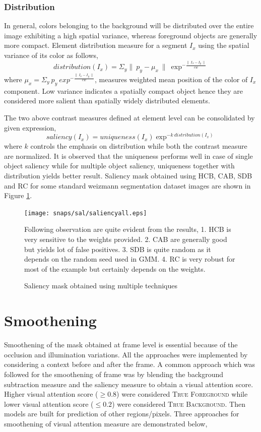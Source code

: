 \subsubsection{Distribution}
In general, colors belonging to the background will be distributed over the entire image exhibiting a high spatial variance, whereas foreground objects are generally more compact. Element distribution measure for a segment $I_{x}$ using the spatial variance of its color as follows,
$$distribution(I_{x}) = \Sigma_{y} \parallel~p_{y} -\mu_{x}~\parallel~\exp^{-\frac{\parallel~I_{x} - I_{y}~\parallel}{cw}}$$ 
where $\mu_{x} = \Sigma_{y}~p_{y}~exp^{-\frac{\parallel~I_{x} - I_{y}~\parallel}{cw}}$, measures weighted mean position of the color of $I_{x}$ component. Low variance indicates a spatially compact object hence they are considered more salient than spatially widely distributed elements.

\par The two above contrast measures defined at element level can be consolidated by given expression,
$$saliency(I_{x}) = uniqueness(I_{x}) \exp^{-k~distribution(I_{x})}$$
where $k$ controls the emphasis on distribution while both the contrast measure are normalized. It is observed that the uniqueness performs well in case of single object saliency while for multiple object saliency, uniqueness together with distribution yields better result. Saliency mask obtained using HCB, CAB, SDB and RC for some standard weizmann segmentation dataset images are shown in Figure \ref{fig:sal}. 

\begin{figure}[htpb]
   \begin{center}
	    \texttt{[image: snaps/sal/saliencyall.eps]}     
     \caption {Saliency mask obtained using multiple techniques}
     \medskip \small 
     Following observation are quite evident from the results, 1. HCB is very sensitive to the weights provided. 2. CAB are generally good but yields lot of false positives. 3. SDB is quite random as it depends on the random seed used in GMM. 4. RC is very robust for most of the example but certainly depends on the weights.
   \label{fig:sal}
   \end{center}
 \end{figure}

 \section{Smoothening}
  \label{sec:ts}
Smoothening of the mask obtained at frame level is essential because of the occlusion and illumination variations. All the approaches were implemented by considering a context before and after the frame. A common approach which was followed for the smoothening of frame was by blending the background subtraction measure and the saliency measure to obtain a visual attention score. Higher visual attention score ($\geqslant0.8$) were considered \textsc{True Foreground} while lower visual attention score ($\leqslant0.2$)  were considered \textsc{True Background}. Then models are built for prediction of other regions/pixels. Three approaches for smoothening of visual attention measure are demonstrated below,
